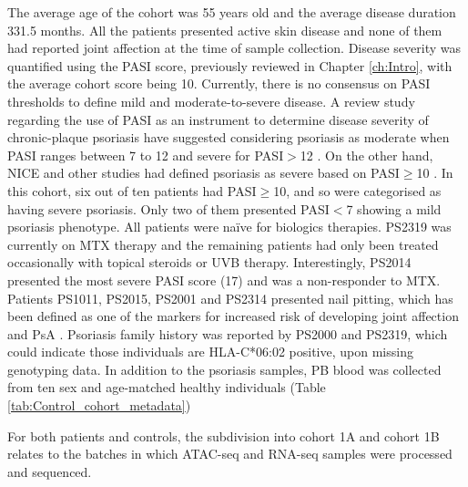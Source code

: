 \bigskip %

The average age of the cohort was 55 years old and the average disease duration 331.5 months. All the patients presented active skin disease and none of them had reported joint affection at the time of sample collection. Disease severity was quantified using the PASI score, previously reviewed in Chapter \ref{ch:Intro}, with the average cohort score being 10. Currently, there is no consensus on PASI thresholds to define mild and moderate-to-severe disease. A review study regarding the use of PASI as an instrument to determine disease severity of chronic-plaque psoriasis have suggested considering psoriasis as moderate when PASI ranges between 7 to 12 and severe for PASI$>$12 \parencite{Schmitt2005}. On the other hand, NICE and other studies had defined psoriasis as severe based on PASI$\geq$10 \parencite{Woolacott2006, Finlay2005}. In this cohort, six out of ten patients had PASI$\geq$10, and so were categorised as having severe psoriasis. Only two of them presented PASI$<$7 showing a mild psoriasis phenotype. All patients were na\"{i}ve for biologics therapies. PS2319 was currently on MTX therapy and the remaining patients had only been treated occasionally with topical steroids or UVB therapy. Interestingly, PS2014 presented the most severe PASI score (17) and was a non-responder to MTX. Patients PS1011, PS2015, PS2001 and PS2314 presented nail pitting, which has been defined as one of the markers for increased risk of developing joint affection and PsA \parencite{Moll1976,Griffiths2007,McGonagle,2011}. Psoriasis family history was reported by PS2000 and PS2319, which could indicate those individuals are HLA-C*06:02 positive, upon missing genotyping data. In addition to the psoriasis samples, PB blood was collected from ten sex and age-matched healthy individuals (Table \ref{tab:Control_cohort_metadata})


For both patients and controls, the subdivision into cohort 1A and cohort 1B relates to the batches in which ATAC-seq and RNA-seq samples were processed and sequenced.


